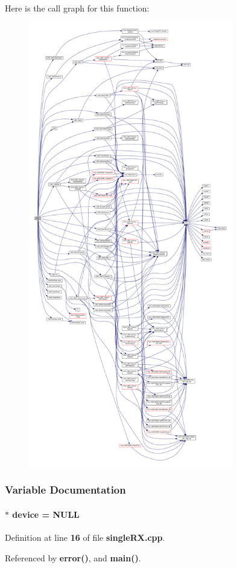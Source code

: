 Here is the call graph for this function\+:
\nopagebreak
\begin{figure}[H]
\begin{center}
\leavevmode
\includegraphics[height=550pt]{d1/d1f/singleRX_8cpp_a3c04138a5bfe5d72780bb7e82a18e627_cgraph}
\end{center}
\end{figure}




\subsubsection{Variable Documentation}
\paragraph[{device}]{$\ast$ device = N\+U\+LL}\label{singleRX_8cpp_a6bc15a746822d9c4a5621463acd4ca25}


Definition at line {\bf 16} of file {\bf single\+R\+X.\+cpp}.



Referenced by {\bf error()}, and {\bf main()}.

